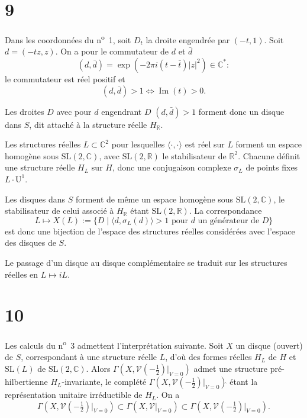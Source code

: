 \documentclass[12pt,a4paper]{article}
\theoremstyle{plain}
\theoremstyle{definition}
\theoremstyle{remark}
\DeclareMathOperator{\Impart}{Im}
\begin{document}
\section*{9}

Dans les coordonnées du n\textsuperscript{o}~1, soit $D_t$ la droite engendrée par $(-t, 1)$. Soit $d = (-tz, z)$. On a pour le commutateur de $d$ et $\bar{d}$
\[(d, \bar{d}) = \exp(-2\pi i(t - \bar{t})|z|^2) \in \mathbb{C}^*:\]
le commutateur est réel positif et
\[(d, \bar{d}) > 1 \iff \Impart(t) > 0.\]

Les droites $D$ avec pour $d$ engendrant $D$ $(d, \bar{d}) > 1$ forment donc un disque dans $S$, dit attaché à la structure réelle $H_\mathbb{R}$.

Les structures réelles $L \subset \mathbb{C}^2$ pour lesquelles $\langle \cdot, \cdot \rangle$ est réel sur $L$ forment un espace homogène sous $\mathrm{SL}(2, \mathbb{C})$, avec $\mathrm{SL}(2, \mathbb{R})$ le stabilisateur de $\mathbb{R}^2$. Chacune définit une structure réelle $H_L$ sur $H$, donc une conjugaison complexe $\sigma_L$ de points fixes $L \cdot \mathrm{U}^1$.

Les disques dans $S$ forment de même un espace homogène sous $\mathrm{SL}(2, \mathbb{C})$, le stabilisateur de celui associé à $H_\mathbb{R}$ étant $\mathrm{SL}(2, \mathbb{R})$. La correspondance
\[L \mapsto X(L) := \{D \mid \langle d, \sigma_L(d) \rangle > 1 \text{ pour } d \text{ un générateur de } D\}\]
est donc une bijection de l'espace des structures réelles considérées avec l'espace des disques de $S$.

Le passage d'un disque au disque complémentaire se traduit sur les structures réelles en $L \mapsto iL$.

\section*{10}

Les calculs du n\textsuperscript{o}~3 admettent l'interprétation suivante. Soit $X$ un disque (ouvert) de $S$, correspondant à une structure réelle $L$, d'où des formes réelles $H_L$ de $H$ et $\mathrm{SL}(L)$ de $\mathrm{SL}(2, \mathbb{C})$. Alors $\Gamma(X, \mathscr{V}(-\frac{1}{2})|_{V=0})$ admet une structure pré-hilbertienne $H_L$-invariante, le complété $\Gamma(X, \mathscr{V}(-\frac{1}{2})|_{V=0})\hat{}$ étant la représentation unitaire irréductible de $H_L$. On a
\[\Gamma(X, \mathscr{V}(-\tfrac{1}{2})|_{V=0}) \subset \Gamma(X, \mathscr{V}|_{V=0}) \subset \Gamma(X, \mathscr{V}(-\tfrac{1}{2})|_{V=0})\hat{}.\]
\end{document}
